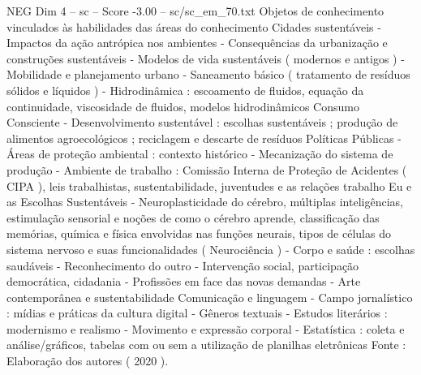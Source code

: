 \begin{textsample}{NEG Dim 4 – sc – Score -3.00 – sc/sc\_em\_70.txt}
Objetos de conhecimento vinculados às habilidades das áreas do conhecimento Cidades sustentáveis - Impactos da ação antrópica nos ambientes - Consequências da urbanização e construções sustentáveis - Modelos de vida sustentáveis ( modernos e antigos ) - Mobilidade e planejamento urbano - Saneamento básico ( tratamento de resíduos sólidos e líquidos ) - Hidrodinâmica : escoamento de fluidos, equação da continuidade, viscosidade de fluidos, modelos hidrodinâmicos Consumo Consciente - Desenvolvimento sustentável : escolhas sustentáveis ; produção de alimentos agroecológicos ; reciclagem e descarte de resíduos Políticas Públicas - Áreas de proteção ambiental : contexto histórico - Mecanização do sistema de produção - Ambiente de trabalho : Comissão Interna de Proteção de Acidentes ( CIPA ), leis trabalhistas, sustentabilidade, juventudes e as relações trabalho Eu e as Escolhas Sustentáveis - Neuroplasticidade do cérebro, múltiplas inteligências, estimulação sensorial e noções de como o cérebro aprende, classificação das memórias, química e física envolvidas nas funções neurais, tipos de células do sistema nervoso e suas funcionalidades ( Neurociência ) - Corpo e saúde : escolhas saudáveis - Reconhecimento do outro - Intervenção social, participação democrática, cidadania - Profissões em face das novas demandas - Arte contemporânea e sustentabilidade Comunicação e linguagem - Campo jornalístico : mídias e práticas da cultura digital - Gêneros textuais - Estudos literários : modernismo e realismo - Movimento e expressão corporal - Estatística : coleta e análise/gráficos, tabelas com ou sem a utilização de planilhas eletrônicas Fonte : Elaboração dos autores ( 2020 ).

\end{textsample}
